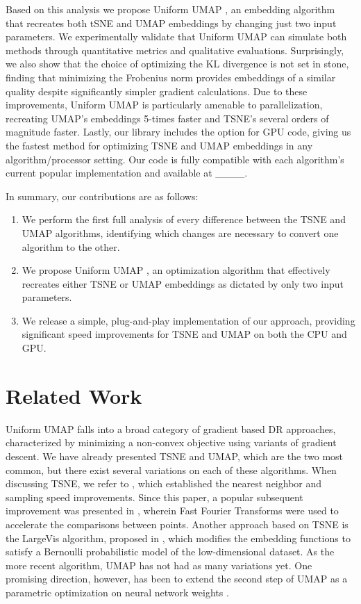 \documentclass[sigconf, nonacm]{acmart}
\newcommand\ourmethod{Uniform UMAP }
\begin{document}
Based on this analysis we propose \ourmethod, an embedding algorithm that recreates both tSNE and UMAP embeddings by changing just two input parameters.
We experimentally validate that \ourmethod can simulate both methods through quantitative metrics and qualitative
evaluations. Surprisingly, we also show that the choice of optimizing the KL divergence is not set in stone, finding that minimizing the Frobenius norm provides
embeddings of a similar quality despite significantly simpler gradient calculations. Due to these improvements, \ourmethod is particularly amenable to
parallelization, recreating UMAP's embeddings 5-times faster and TSNE's several orders of magnitude faster.
Lastly, our library includes the option for GPU code, giving us the fastest method for optimizing TSNE and UMAP embeddings in any algorithm/processor setting.
Our code is fully compatible with each algorithm's current popular implementation and available at \_\_\_\_.

In summary, our contributions are as follows:
\begin{enumerate}
        \item We perform the first full analysis of every difference between the TSNE and UMAP algorithms, identifying which changes are necessary to
        convert one algorithm to the other.
        \item We propose \ourmethod, an optimization algorithm that effectively recreates either TSNE or UMAP embeddings as dictated by only two input
            parameters.
        \item We release a simple, plug-and-play implementation of our approach, providing significant speed improvements for TSNE and UMAP on both
        the CPU and GPU.
\end{enumerate}

\section{Related Work}

\ourmethod falls into a broad category of gradient based DR approaches, characterized by minimizing a non-convex objective using variants of gradient descent.
We have already presented TSNE and UMAP, which are the two most common, but there exist several variations on each of these algorithms. When discussing TSNE, we
refer to \cite{van2014accelerating}, which established the nearest neighbor and sampling speed improvements. Since this paper, a popular subsequent improvement
was presented in \cite{linderman2019fast}, wherein Fast Fourier Transforms were used to accelerate the comparisons between points. Another approach based on
TSNE is the LargeVis algorithm, proposed in \cite{tang2016visualizing}, which modifies the embedding functions to satisfy a Bernoulli probabilistic model of
the low-dimensional dataset. As the more recent algorithm, UMAP has not had as many variations yet. One promising direction, however, has been to extend the
second step of UMAP as a parametric optimization on neural network weights \cite{sainburg2020parametric}.
\end{document}
